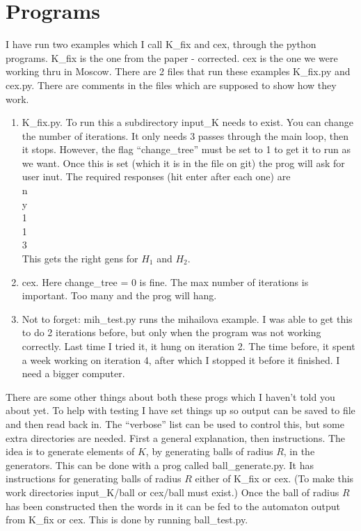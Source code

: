 \documentclass[a4paper,12pt]{article}
\numberwithin{equation}{section}
\numberwithin{figure}{section}
\newcommand{\be}{\begin{enumerate}}
\newcommand{\ee}{\end{enumerate}}
\begin{document}
\section{Programs}
I have run two examples which I call K\_fix and cex, through the python programs. K\_fix is the one
from the paper - corrected. cex is the one we were working thru in Moscow. There are 2 files that run these examples
K\_fix.py and cex.py. There are comments in the files which are supposed to show how they work. 
\be
\item K\_fix.py. To run this a subdirectory input\_K needs to exist. You can change the number of iterations. It only needs 3 
passes through the main loop, then it stops. However, the flag ``change\_tree'' must be set to 1 to get it to run as we want.
Once this is set (which it is in the file on git) the prog will ask for user inut. The required responses (hit enter after each one) are\\
n\\
y\\
1\\
1\\
3\\

This gets the right gens for $H_1$ and $H_2$. 
\item cex. Here change\_tree = 0 is fine. The max number of iterations is important. Too many and the prog will hang. 
\item Not to forget: mih\_test.py runs the mihailova example. I was able to get this to do 2 iterations before, but only 
when the program was not working correctly. Last time I tried it, it hung on iteration 2. The time before, it spent a week 
working on iteration 4, after which I stopped it before it finished. I need a bigger computer. 
\ee
There are some other things about both these progs which I haven't told you about yet.
To help with testing I have set things up so output can be saved to file and then read back in.
The ``verbose'' list can be used to control this, but some extra directories are needed. 
First a general explanation, then instructions. 
The idea is to generate elements of $K$, by generating balls of radius $R$, in the generators. 
This can be done with a prog called ball\_generate.py. It has instructions for generating 
balls of radius $R$ either of K\_fix or cex. (To make this work directories input\_K/ball or cex/ball must exist.)
Once the ball of radius $R$ has been constructed then the words in it can be fed to the automaton output
from K\_fix or cex. This is done by running ball\_test.py. 
\end{document}
